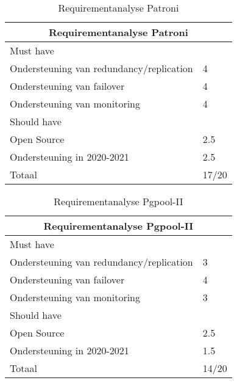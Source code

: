 \begin{table}[!h]
    \centering
    \begin{tabular}{ |p{6cm}||p{6cm}|  }
        \hline
        \multicolumn{2}{|c|}{Requirementanalyse Patroni} \\
        \hline
        Must have & \\
        \hline
        Ondersteuning van redundancy/replication  & 4 \\
        Ondersteuning van failover &  4 \\
        Ondersteuning van monitoring & 4 \\
        \hline
        Should have & \\
        \hline
        Open Source &  2.5 \\
        Ondersteuning in 2020-2021 & 2.5 \\
        \hline
        \hline
        Totaal & 17/20 \\
        \hline
    \end{tabular}
    \caption{Requirementanalyse Patroni}
    \label{table:Requirementanalyse Patroni}
\end{table}


\begin{table}[!h]
    \centering
    \begin{tabular}{ |p{6cm}||p{6cm}|  }
        \hline
        \multicolumn{2}{|c|}{Requirementanalyse Pgpool-II} \\
        \hline
        Must have & \\
        \hline
        Ondersteuning van redundancy/replication  & 3 \\
        Ondersteuning van failover &  4 \\
        Ondersteuning van monitoring & 3 \\
        \hline
        Should have & \\
        \hline
        Open Source &  2.5 \\
        Ondersteuning in 2020-2021 & 1.5 \\
        \hline
        \hline
        Totaal & 14/20 \\
        \hline
    \end{tabular}
    \caption{Requirementanalyse Pgpool-II}
    \label{table:Requirementanalyse Pgpool-II}
\end{table}

